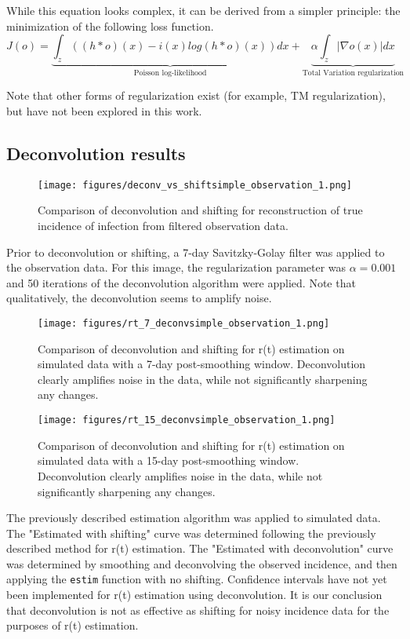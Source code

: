 \documentclass{article}
\newcommand{\code}[1]{\texttt{#1}}
\begin{document}
While this equation looks complex, it can be derived from a simpler principle: the minimization of the following loss function. 
\begin{equation}
    J(o) = \underbrace{\int_z ((h*o)(x) - i(x) log(h*o)(x))dx}_{\mbox{Poisson log-likelihood}} + \underbrace{\alpha \int_z |\nabla o(x)| dx}_{\mbox{Total Variation regularization}}
\end{equation}

Note that other forms of regularization exist (for example, TM regularization), but have not been explored in this work.

\subsection{Deconvolution results}
\begin{figure}[h!]
\centering
\texttt{[image: figures/deconv\_vs\_shiftsimple\_observation\_1.png]}
\caption{Comparison of deconvolution and shifting for reconstruction of true incidence of infection from filtered observation data.}
\end{figure}
Prior to deconvolution or shifting, a 7-day Savitzky-Golay filter was applied to the observation data. For this image, the regularization parameter was $\alpha = 0.001$ and 50 iterations of the deconvolution algorithm were applied. Note that qualitatively, the deconvolution seems to amplify noise.

\clearpage
\begin{figure}[h!]
\centering
\texttt{[image: figures/rt\_7\_deconvsimple\_observation\_1.png]}
\caption{Comparison of deconvolution and shifting for r(t) estimation on simulated data with a 7-day post-smoothing window. Deconvolution clearly amplifies noise in the data, while not significantly sharpening any changes.}
\end{figure}

\begin{figure}[h!]
\centering
\texttt{[image: figures/rt\_15\_deconvsimple\_observation\_1.png]}
\caption{Comparison of deconvolution and shifting for r(t) estimation on simulated data with a 15-day post-smoothing window. Deconvolution clearly amplifies noise in the data, while not significantly sharpening any changes.}
\end{figure}

The previously described estimation algorithm was applied to simulated data. The "Estimated with shifting" curve was determined following the previously described method for r(t) estimation. The "Estimated with deconvolution" curve was determined by smoothing and deconvolving the observed incidence, and then applying the \code{estim} function with no shifting. Confidence intervals have not yet been implemented for r(t) estimation using deconvolution. 
It is our conclusion that deconvolution is not as effective as shifting for noisy incidence data for the purposes of r(t) estimation.
\end{document}
